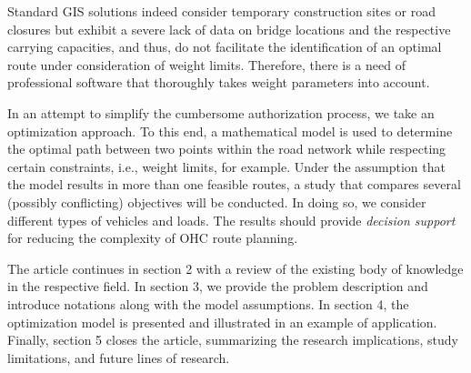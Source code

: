 Standard GIS solutions indeed consider temporary construction sites or road closures but exhibit a severe lack of data on bridge locations and the respective carrying capacities, and thus, do not facilitate the identification of an optimal route under consideration of weight limits.
Therefore, there is a need of professional software that thoroughly takes weight parameters into account.
\par In an attempt to simplify the cumbersome authorization process, we take an optimization approach.
To this end, a mathematical model is used to determine the optimal path between two points within the road network while respecting certain constraints, i.e., weight limits, for example.
Under the assumption that the model results in more than one feasible routes, a study that compares several (possibly conflicting) objectives will be conducted.
In doing so, we consider different types of vehicles and loads. The results should provide \textit{decision support} for reducing the complexity of OHC route planning. 
\par
The article continues in section 2 with a review of the existing body of knowledge in the respective field.
In section 3, we provide the problem description and introduce notations along with the model assumptions. In section 4, the optimization model is presented and illustrated in an example of application.
Finally, section 5 closes the article, summarizing the research implications, study limitations, and future lines of research.
